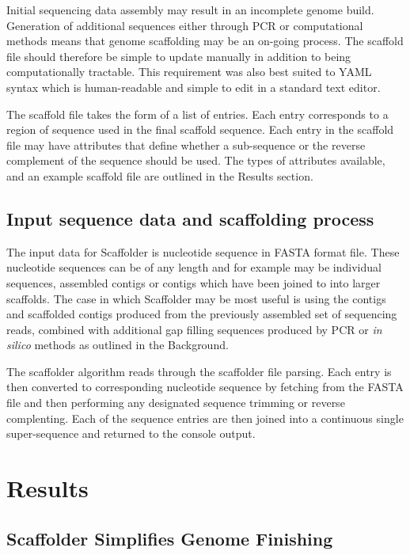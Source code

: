 \documentclass[10pt]{bmc_article}
\newenvironment{bmcformat}{\begin{raggedright}\baselineskip20pt\sloppy\setboolean{publ}{false}}{\end{raggedright}\baselineskip20pt\sloppy}
\begin{document}
\begin{bmcformat}
Initial sequencing data assembly may result in an incomplete genome build.
Generation of additional sequences either through PCR or computational methods
means that genome scaffolding may be an on-going process. The scaffold file
should therefore be simple to update manually in addition to being
computationally tractable. This requirement was also best suited to YAML
syntax which is human-readable and simple to edit in a standard text editor.
\pb

The scaffold file takes the form of a list of entries. Each entry corresponds
to a region of sequence used in the final scaffold sequence. Each entry in the
scaffold file may have attributes that define whether a sub-sequence or the
reverse complement of the sequence should be used. The types of attributes
available, and an example scaffold file are outlined in the Results section.
\pb

\subsection*{Input sequence data and scaffolding process} %

The input data for Scaffolder is nucleotide sequence in FASTA format file.
These nucleotide sequences can be of any length and for example may be
individual sequences, assembled contigs or contigs which have been joined to
into larger scaffolds. The case in which Scaffolder may be most useful is
using the contigs and scaffolded contigs produced from the previously
assembled set of sequencing reads, combined with additional gap filling
sequences produced by PCR or \emph{in silico} methods as outlined in the
Background. \pb

The scaffolder algorithm reads through the scaffolder file parsing. Each entry
is then converted to corresponding nucleotide sequence by fetching from the
FASTA file and then performing any designated sequence trimming or reverse
complenting. Each of the sequence entries are then joined into a continuous
single super-sequence and returned to the console output. \pb

\clearpage

\section*{Results} %

\subsection*{Scaffolder Simplifies Genome Finishing} %


\end{bmcformat}
\end{document}
